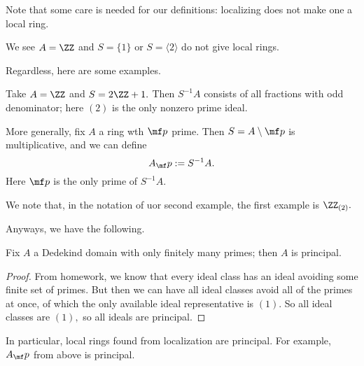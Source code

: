 \documentclass[../notes.tex]{subfiles}
\begin{document}
Note that some care is needed for our definitions: localizing does not make one a local ring. 
\begin{nex}
    We see $A=\ZZ$ and $S=\{1\}$ or $S=\langle2\rangle$ do not give local rings.
\end{nex}
Regardless, here are some examples.
\begin{example}
    Take $A=\ZZ$ and $S=2\ZZ+1.$ Then $S^{-1}A$ consists of all fractions with odd denominator; here $(2)$ is the only nonzero prime ideal.
\end{example}
\begin{example}
    More generally, fix $A$ a ring wth $\mf p$ prime. Then $S=A\setminus\mf p$ is multiplicative, and we can define
    \[A_\mf p:=S^{-1}A.\]
    Here $\mf p$ is the only prime of $S^{-1}A.$
\end{example}
We note that, in the notation of uor second example, the first example is $\ZZ_{(2)}.$

Anyways, we have the following.
\begin{proposition}
    Fix $A$ a Dedekind domain with only finitely many primes; then $A$ is principal.
\end{proposition}
\begin{proof}
    From homework, we know that every ideal class has an ideal avoiding some finite set of primes. But then we can have all ideal classes avoid all of the primes at once, of which the only available ideal representative is $(1).$ So all ideal classes are $(1),$ so all ideals are principal.
\end{proof}
In particular, local rings found from localization are principal. For example, $A_\mf p$ from above is principal.
\end{document}
